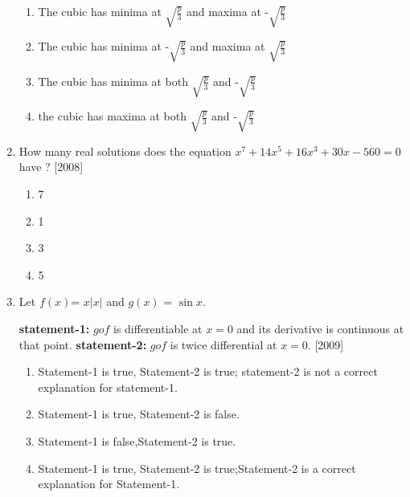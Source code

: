 \documentclass[journal,12pt,onecolumn]{IEEEtran}
\theoremstyle{remark}
\begin{document}
\begin{enumerate}
\begin{enumerate}
        \item The cubic has minima at $\sqrt{\frac{p}{3}}$ and maxima at -$\sqrt{\frac{p}{3}}$
        \item The cubic has minima at -$\sqrt{\frac{p}{3}}$ and maxima at $\sqrt{\frac{p}{3}}$
        \item The cubic has minima at both $\sqrt{\frac{p}{3}}$ and -$\sqrt{\frac{p}{3}}$
        \item the cubic has maxima at both $\sqrt{\frac{p}{3}}$ and -$\sqrt{\frac{p}{3}}$
        
        
        \end{enumerate}
        
            
        \item How many real solutions does the equation $ x^7 + 14x^5 + 16x^3 + 30x- 560 = 0$ have ? \hfill[2008]
         \begin{multicols}{4}
        \begin{enumerate}
    
            
        
            \item 7
        \item 1
        \item 3
        \item 5
        
        \end{enumerate}
        \end{multicols}
            
        \item Let $f(x)$= $x$$\left |x\right|$ and $g(x)$ = $\sin{x}$.
        
    \textbf{statement-1:}  $gof$ is differentiable at $x=0$ and its derivative is continuous at that point.
            \textbf{statement-2:  }$gof$ is twice differential at $x = 0$. 
                 \hfill[2009] 
                  
        
    
        \begin{enumerate}
        
            
        
            \item Statement-1 is true, Statement-2 is true; statement-2 is not a correct explanation for statement-1.
            
        \item Statement-1 is true, Statement-2 is false.
        \item Statement-1 is false,Statement-2 is true.
        \item Statement-1 is true, Statement-2 is true;Statement-2 is a correct explanation for Statement-1.


\end{enumerate}
\end{enumerate}
\end{document}
